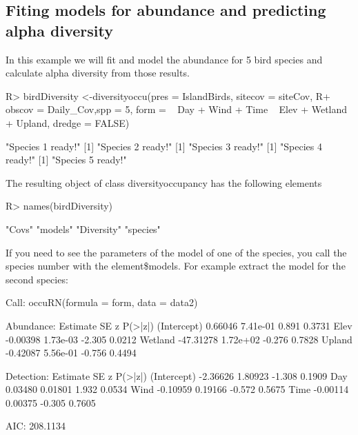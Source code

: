 \documentclass[article]{jss}
\begin{document}
\subsection{Fiting models for abundance and predicting alpha
diversity}\label{fiting-models-for-abundance-and-predicting-alpha-diversity}

In this example we will fit and model the abundance for 5 bird species
and calculate alpha diversity from those results.

\begin{CodeChunk}

\begin{CodeInput}
R> birdDiversity <-diversityoccu(pres = IslandBirds, sitecov = siteCov,
R+ obscov = Daily_Cov,spp =  5, form = ~ Day + Wind + Time ~ Elev + Wetland + Upland, dredge = FALSE)
\end{CodeInput}

\begin{CodeOutput}
[1] "Species 1 ready!"
[1] "Species 2 ready!"
[1] "Species 3 ready!"
[1] "Species 4 ready!"
[1] "Species 5 ready!"
\end{CodeOutput}
\end{CodeChunk}

The resulting object of class diversityoccupancy has the following
elements

\begin{CodeChunk}

\begin{CodeInput}
R> names(birdDiversity)
\end{CodeInput}

\begin{CodeOutput}
[1] "Covs"      "models"    "Diversity" "species"  
\end{CodeOutput}
\end{CodeChunk}

If you need to see the parameters of the model of one of the species,
you call the species number with the element\$models. For example
extract the model for the second species:

\begin{CodeChunk}


\begin{CodeOutput}

Call:
occuRN(formula = form, data = data2)

Abundance:
             Estimate       SE      z P(>|z|)
(Intercept)   0.66046 7.41e-01  0.891  0.3731
Elev         -0.00398 1.73e-03 -2.305  0.0212
Wetland     -47.31278 1.72e+02 -0.276  0.7828
Upland       -0.42087 5.56e-01 -0.756  0.4494

Detection:
            Estimate      SE      z P(>|z|)
(Intercept) -2.36626 1.80923 -1.308  0.1909
Day          0.03480 0.01801  1.932  0.0534
Wind        -0.10959 0.19166 -0.572  0.5675
Time        -0.00114 0.00375 -0.305  0.7605

AIC: 208.1134 
\end{CodeOutput}
\end{CodeChunk}
\end{document}
